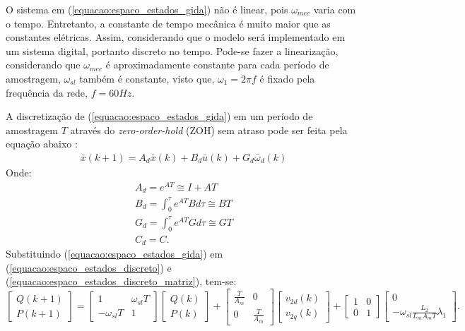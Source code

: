 	O sistema em (\ref{equacao:espaco_estados_gida}) não é linear, pois $\omega_{mec}$ varia com o tempo. Entretanto, a constante de tempo mecânica é muito maior que as constantes elétricas. Assim, considerando que o modelo será implementado em um sistema digital, portanto discreto no tempo. Pode-se fazer a linearização, considerando que $\omega_{mec}$ é aproximadamente constante para cada período de amostragem, $\omega_{sl}$ também é constante, visto que, $\omega_1=2\pi f$ é fixado pela frequência da rede, $f=60Hz$. 
	
	A discretização de (\ref{equacao:espaco_estados_gida}) em um período de amostragem $T$ através do \emph{zero-order-hold} (ZOH) sem atraso pode ser feita pela equação abaixo \cite{franklinpowell}:
	\begin{equation}
		\label{equacao:espaco_estados_discreto}
		\begin{split}
			\bar{x}(k+1)=A_d\bar{x}(k)+B_d\bar{u}(k)+G_d\bar{\omega}_d(k)
		\end{split}
	\end{equation}
	Onde:
	\begin{equation}
		\label{equacao:espaco_estados_discreto_matriz}
		\begin{split}
			A_d=e^{AT}\cong I+AT \\
			B_d=\int_0^\tau e^{AT}Bd\tau \cong BT \\
			G_d=\int_0^\tau e^{AT}Gd\tau \cong GT \\
			C_d = C.
		\end{split}
	\end{equation}
	Substituindo (\ref{equacao:espaco_estados_gida}) em (\ref{equacao:espaco_estados_discreto}) e (\ref{equacao:espaco_estados_discreto_matriz}), tem-se:
	\begin{equation}
		\label{equacao:gida_espaco_estados_discreto}
		\begin{bmatrix}
			Q(k+1) \\
			P(k+1)
		\end{bmatrix} = 
		\begin{bmatrix}
			1             & \omega_{sl}T \\
			-\omega_{sl}T & 1
		\end{bmatrix}
		\begin{bmatrix}
			Q(k) \\
			P(k)
		\end{bmatrix} + 
		\begin{bmatrix}
			\frac{T}{A_m} & 0 \\
			0 & \frac{T}{A_m}
		\end{bmatrix}
		\begin{bmatrix}
			v_{2d}(k) \\
			v_{2q}(k)
		\end{bmatrix} +
		\begin{bmatrix}
			1 & 0 \\
			0 & 1 
		\end{bmatrix} 
		\begin{bmatrix}
			0 \\
			-\omega_{sl}\frac{L_2}{L_mA_mT}\lambda_1
		\end{bmatrix}.
	\end{equation}
	
